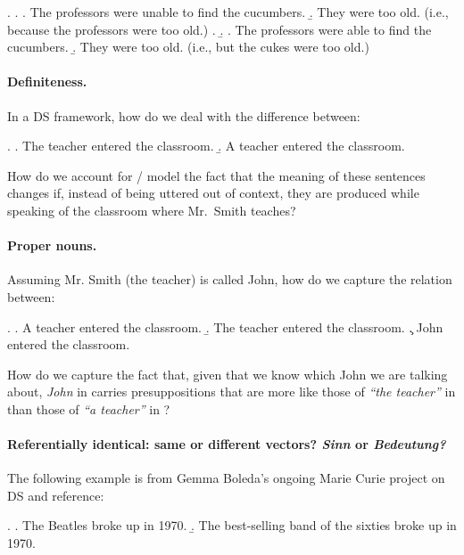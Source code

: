 \documentclass[a4paper,12pt]{article}
\begin{document}
\ex. \a. \a.  The professors were unable to find the cucumbers.
        \b.  They were too old.  (i.e., because the professors were too old.)
\z.
     \b. \a. The professors were able to find the cucumbers.
        \b. They were too old. (i.e., but the cukes were too old.)

\paragraph{Definiteness.}

In a DS framework, how do we deal with
the difference between:

\ex. \a. The teacher entered the classroom.
\b. A teacher entered the classroom.

How do 
we account for / model the fact that the meaning
of these sentences changes if, instead of
being uttered out of context, they are produced while speaking of the
classroom where Mr.~Smith teaches?

\paragraph{Proper nouns.}

Assuming Mr. Smith (the teacher) is called John, how do we capture the
relation between:

\ex. \a. A teacher entered the classroom.
\b. The teacher entered the classroom.
\c. John entered the classroom.

How do we capture the fact that, given that we know which John we are
talking about, \emph{John} in \Last[c] carries presuppositions that
are more like those of \emph{``the teacher''} in \Last[b] than those
of \emph{``a teacher''} in \Last[a]?

\paragraph{Referentially identical: same or different
  vectors? \emph{Sinn} or \emph{Bedeutung?}}

The following example is from Gemma Boleda's ongoing Marie Curie
project on DS and reference:

\ex. \a. The Beatles broke up in 1970.
\b. The best-selling band of the sixties broke up in 1970.



\end{document}
